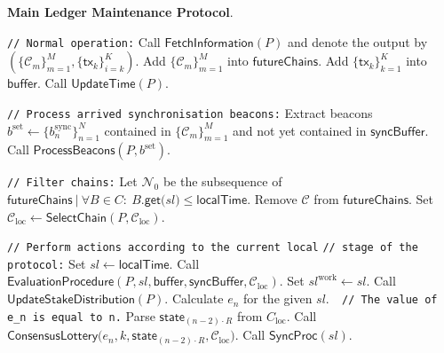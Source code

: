 \bigbreak
\bigbreak
\noindent
{}
\textbf{Main Ledger Maintenance Protocol}.\label{apndx:main-ledger-protocol}
\begin{protocol}
    \caption{$\textsf{LedgerMaintenance}(P, R, \mathcal{C}_{\text{loc}})$}
    \begin{algorithmic}[1]

        \noindent
        \lstinline|// Normal operation:|
        \State Call $\textsf{FetchInformation}(P)$ and denote the output by $(\{\mathcal{C}_m\}_{m=1}^M, \{\textsf{tx}_k\}_{i=k}^K)$.
        \State Add $\{\mathcal{C}_m\}_{m=1}^M$ into $\textsf{futureChains}$.
        \State Add $\{\textsf{tx}_k\}_{k=1}^K$ into $\textsf{buffer}$.
        \State Call $\textsf{UpdateTime}(P)$.

        \noindent
        \lstinline|// Process arrived synchronisation beacons:|
        \State Extract beacons $b^{\text{set}} \leftarrow \{b^{\text{sync}}_n\}_{n=1}^N$ contained in $\{\mathcal{C}_m\}_{m=1}^M$ and not yet contained in $\textsf{syncBuffer}$.
        \State Call $\textsf{ProcessBeacons}(P, b^{\text{set}})$.

        \noindent
        \lstinline|// Filter chains:|
        \State Let $\mathcal{N}_0$ be the subsequence of $\textsf{futureChains}\ |\ \forall B \in C:\ B{\textsf{.get(} sl \textsf{)}} \leq \textsf{localTime}$.
            \State Remove $\mathcal{C}$ from $\textsf{futureChains}$.
        \EndFor
        \State Set $\mathcal{C}_{\text{loc}} \leftarrow \textsf{SelectChain}(P, \mathcal{C}_{\text{loc}})$.

        \noindent
        \lstinline|// Perform actions according to the current local|
        \noindent
        \lstinline|// stage of the protocol:|
        \State Set $sl \leftarrow \textsf{localTime}$.
            \State Call $\textsf{EvaluationProcedure}(P, sl, \textsf{buffer}, \textsf{syncBuffer}, \mathcal{C}_{\text{loc}})$.
            \State Set $sl^{\text{work}} \leftarrow sl$.
                \State Call $\textsf{UpdateStakeDistribution}(P)$.
                \State Calculate $e_n$ for the given $sl$.\lstinline|  // The value of e_n is equal to n.|
                \State Parse $\textsf{state}_{(n - 2)\cdot R}$ from $C_{\text{loc}}$.
                    \State Call $\textsf{ConsensusLottery(}e_n, k, \textsf{state}_{(n - 2)\cdot R}, \mathcal{C}_{\text{loc}}\textsf{)}$.
                \EndFor
                \State Call $\textsf{SyncProc}(sl)$.
            \EndIf
        \EndIf

    \end{algorithmic}\label{alg:main-ledger-protocol}
\end{protocol}
